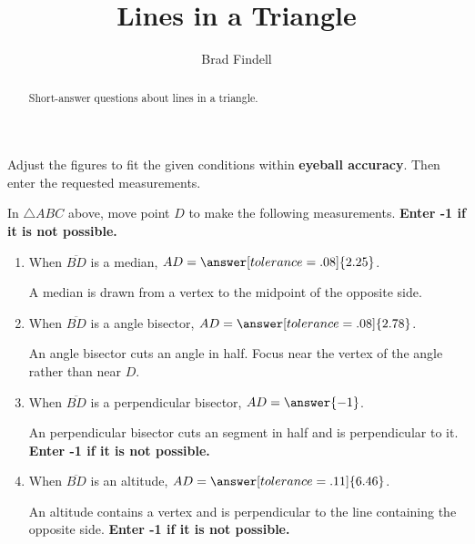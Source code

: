 \documentclass[nooutcomes]{ximera}
\title{Lines in a Triangle}
\author{Brad Findell}
\begin{document}
\begin{abstract}
Short-answer questions about lines in a triangle.
\end{abstract}
\maketitle

Adjust the figures to fit the given conditions within \textbf{eyeball accuracy}.  Then enter the requested measurements.  


\begin{problem}
\begin{center}  
\end{center}
In $\triangle ABC$ above, move point $D$ to make the following measurements.  \textbf{Enter -1 if it is not possible.}   
\begin{enumerate}
\item When $\overline{BD}$ is a median, $AD=\answer[tolerance=.08]{2.25}$.
\begin{hint}
A median is drawn from a vertex to the midpoint of the opposite side.
\end{hint}
\item When $\overline{BD}$ is a angle bisector, $AD=\answer[tolerance=.08]{2.78}$.
\begin{hint}
An angle bisector cuts an angle in half.  Focus near the vertex of the angle rather than near $D$.
\end{hint}
\item When $\overline{BD}$ is a perpendicular bisector, $AD=\answer{-1}$.
\begin{hint}
An perpendicular bisector cuts an segment in half and is perpendicular to it. \textbf{Enter -1 if it is not possible.} 
\end{hint}
\item When $\overline{BD}$ is an altitude, $AD=\answer[tolerance=.11]{6.46}$.
\begin{hint}
An altitude contains a vertex and is perpendicular to the line containing the opposite side. \textbf{Enter -1 if it is not possible.} 
\end{hint}
\end{enumerate}
\end{problem}
\end{document}
